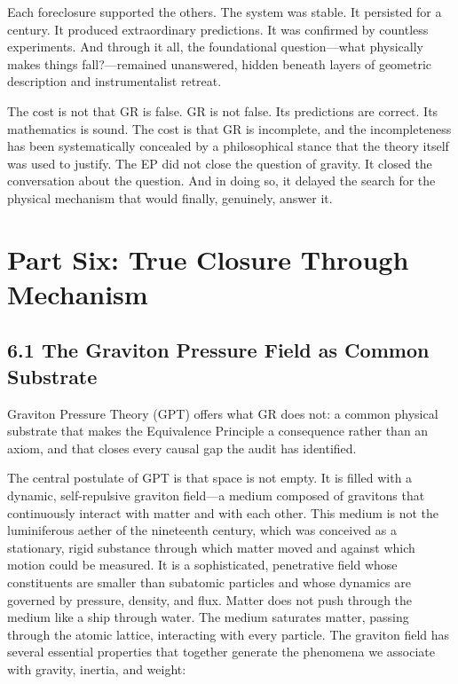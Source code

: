 \documentclass[11pt]{article}
\begin{document}
Each foreclosure supported the others. The system was stable. It persisted for a century. It produced extraordinary predictions. It was confirmed by countless experiments. And through it all, the foundational question---what physically makes things fall?---remained unanswered, hidden beneath layers of geometric description and instrumentalist retreat.

The cost is not that GR is false. GR is not false. Its predictions are correct. Its mathematics is sound. The cost is that GR is incomplete, and the incompleteness has been systematically concealed by a philosophical stance that the theory itself was used to justify. The EP did not close the question of gravity. It closed the conversation about the question. And in doing so, it delayed the search for the physical mechanism that would finally, genuinely, answer it.

\section{Part Six: True Closure Through Mechanism}

\subsection{6.1 The Graviton Pressure Field as Common Substrate}

Graviton Pressure Theory (GPT) offers what GR does not: a common physical substrate that makes the Equivalence Principle a consequence rather than an axiom, and that closes every causal gap the audit has identified.

The central postulate of GPT is that space is not empty. It is filled with a dynamic, self-repulsive graviton field---a medium composed of gravitons that continuously interact with matter and with each other. This medium is not the luminiferous aether of the nineteenth century, which was conceived as a stationary, rigid substance through which matter moved and against which motion could be measured. It is a sophisticated, penetrative field whose constituents are smaller than subatomic particles and whose dynamics are governed by pressure, density, and flux. Matter does not push through the medium like a ship through water. The medium saturates matter, passing through the atomic lattice, interacting with every particle. The graviton field has several essential properties that together generate the phenomena we associate with gravity, inertia, and weight:
\end{document}
